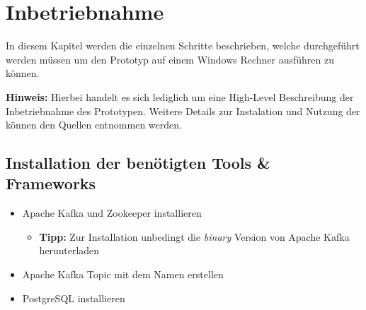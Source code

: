\chapter{Inbetriebnahme}
\label{chap:betrieb}
In diesem Kapitel werden die einzelnen Schritte beschrieben, welche durchgeführt werden müssen um den Prototyp auf einem Windows Rechner ausführen zu können.

\textbf{Hinweis:}
\newline
Hierbei handelt es sich lediglich um eine High-Level Beschreibung der Inbetriebnahme des Prototypen.
Weitere Details zur Instalation und Nutzung der können den Quellen entnommen werden.
\newline

\section{Installation der benötigten Tools \& Frameworks}
\begin{itemize}
  \item Apache Kafka und Zookeeper installieren
  \begin{itemize}
    \item \textbf{Tipp:} Zur Installation unbedingt die \textit{binary} Version von Apache Kafka herunterladen
  \end{itemize}
  \item Apache Kafka Topic mit dem Namen  erstellen
  \item PostgreSQL installieren
\end{itemize}


